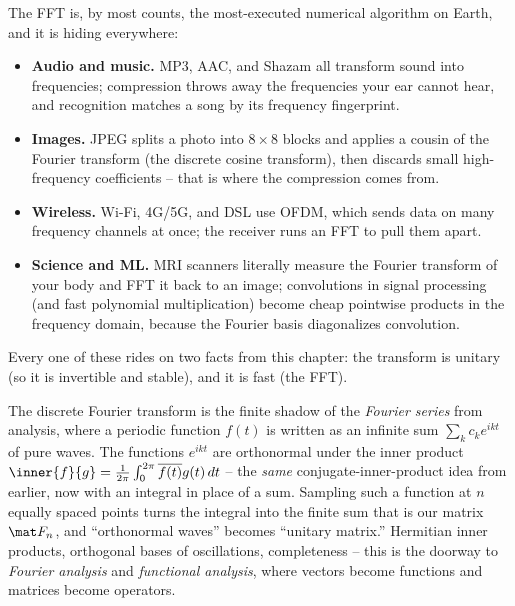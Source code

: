 \begin{applicationbox}
The FFT is, by most counts, the most-executed numerical algorithm on Earth, and it
is hiding everywhere:
\begin{itemize}
  \item \textbf{Audio and music.} MP3, AAC, and Shazam all transform sound into
        frequencies; compression throws away the frequencies your ear cannot hear,
        and recognition matches a song by its frequency fingerprint.
  \item \textbf{Images.} JPEG splits a photo into $8\times 8$ blocks and applies a
        cousin of the Fourier transform (the discrete cosine transform), then
        discards small high-frequency coefficients -- that is where the compression
        comes from.
  \item \textbf{Wireless.} Wi-Fi, 4G/5G, and DSL use OFDM, which sends data on many
        frequency channels at once; the receiver runs an FFT to pull them apart.
  \item \textbf{Science and ML.} MRI scanners literally measure the Fourier
        transform of your body and FFT it back to an image; convolutions in signal
        processing (and fast polynomial multiplication) become cheap pointwise
        products in the frequency domain, because the Fourier basis diagonalizes
        convolution.
\end{itemize}
Every one of these rides on two facts from this chapter: the transform is unitary
(so it is invertible and stable), and it is fast (the FFT).
\end{applicationbox}

\begin{connectionbox}
The discrete Fourier transform is the finite shadow of the \emph{Fourier series}
from analysis, where a periodic function $f(t)$ is written as an infinite sum
$\sum_k c_k e^{ikt}$ of pure waves. The functions $e^{ikt}$ are orthonormal under
the inner product $\inner{f}{g}=\frac1{2\pi}\int_0^{2\pi}\overline{f(t)}g(t)\,dt$ --
the \emph{same} conjugate-inner-product idea from earlier, now with an integral in
place of a sum. Sampling such a function at $n$ equally spaced points turns the
integral into the finite sum that is our matrix $\mat F_n$, and ``orthonormal
waves'' becomes ``unitary matrix.'' Hermitian inner products, orthogonal bases of
oscillations, completeness -- this is the doorway to \emph{Fourier analysis} and
\emph{functional analysis}, where vectors become functions and matrices become
operators.
\end{connectionbox}


